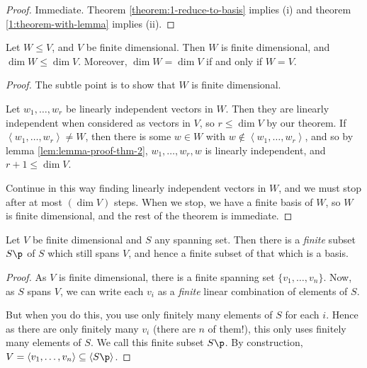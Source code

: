 \begin{proof}
	Immediate. Theorem \ref{theorem:1-reduce-to-basis} implies (i) and theorem \ref{1:theorem-with-lemma} implies (ii). %
\end{proof}

\begin{lemma}
	Let $W\leq V$, and $V$ be finite dimensional. Then $W$ is finite dimensional, and $\dim W\leq \dim V$. Moreover, $\dim W = \dim V$ if and only if $W=V$. %
\end{lemma}

\begin{proof}
	The subtle point is to show that $W$ is finite dimensional. %
	
	Let $w_1,\ldots,w_r$ be linearly independent vectors in $W$. Then they are linearly independent when considered as vectors in $V$, so $r\leq \dim V$ by our theorem. If $\left\langle w_1,\ldots,w_r \right\rangle\neq W$, then there is some $w\in W$ with $w\not\in\left\langle w_1,\ldots,w_r \right\rangle$, and so by lemma \ref{lem:lemma-proof-thm-2}, $w_1,\ldots,w_r,w$ is linearly independent, and $r+1\leq \dim V$. %
	
	Continue in this way finding linearly independent vectors in $W$, and we must stop after at most $(\dim V)$ steps. When we stop, we have a finite basis of $W$, so $W$ is finite dimensional, and the rest of the theorem is immediate. %
\end{proof}

\begin{lemma}
	Let $V$ be finite dimensional and $S$ any spanning set. Then there is a \emph{finite} subset $S\p$ of $S$ which still spans $V$, and hence a finite subset of that which is a basis. %
\end{lemma}

\begin{proof}
	As $V$ is finite dimensional, there is a finite spanning set $\{v_1,\ldots,v_n\}$. Now, as $S$ spans $V$, we can write each $v_i$ as a \emph{finite} linear combination of elements of $S$. %
	
	But when you do this, you use only finitely many elements of $S$ for each $i$. Hence as there are only finitely many $v_i$ (there are $n$ of them!),  this only uses finitely many elements of $S$. We call this finite subset $S\p$. By construction, $V =  \left\langle v_1,\ldots,v_n \right\rangle \subseteq \left\langle S\p \right\rangle$. %
\end{proof}


